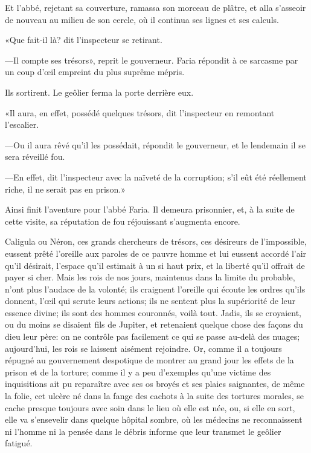 Et l'abbé, rejetant sa couverture, ramassa son morceau de plâtre, et alla s'asseoir de nouveau au milieu de son cercle, où il continua ses lignes et ses calculs.

«Que fait-il là? dit l'inspecteur se retirant.

—Il compte ses trésors», reprit le gouverneur. Faria répondit à ce sarcasme par un coup d'œil empreint du plus suprême mépris.

Ils sortirent. Le geôlier ferma la porte derrière eux.

«Il aura, en effet, possédé quelques trésors, dit l'inspecteur en remontant l'escalier.

—Ou il aura rêvé qu'il les possédait, répondit le gouverneur, et le lendemain il se sera réveillé fou.

—En effet, dit l'inspecteur avec la naïveté de la corruption; s'il eût été réellement riche, il ne serait pas en prison.»

Ainsi finit l'aventure pour l'abbé Faria. Il demeura prisonnier, et, à la suite de cette visite, sa réputation de fou réjouissant s'augmenta encore.

Caligula ou Néron, ces grands chercheurs de trésors, ces désireurs de l'impossible, eussent prêté l'oreille aux paroles de ce pauvre homme et lui eussent accordé l'air qu'il désirait, l'espace qu'il estimait à un si haut prix, et la liberté qu'il offrait de payer si cher. Mais les rois de nos jours, maintenus dans la limite du probable, n'ont plus l'audace de la volonté; ils craignent l'oreille qui écoute les ordres qu'ils donnent, l'œil qui scrute leurs actions; ils ne sentent plus la supériorité de leur essence divine; ils sont des hommes couronnés, voilà tout. Jadis, ils se croyaient, ou du moins se disaient fils de Jupiter, et retenaient quelque chose des façons du dieu leur père: on ne contrôle pas facilement ce qui se passe au-delà des nuages; aujourd'hui, les rois se laissent aisément rejoindre. Or, comme il a toujours répugné au gouvernement despotique de montrer au grand jour les effets de la prison et de la torture; comme il y a peu d'exemples qu'une victime des inquisitions ait pu reparaître avec ses os broyés et ses plaies saignantes, de même la folie, cet ulcère né dans la fange des cachots à la suite des tortures morales, se cache presque toujours avec soin dans le lieu où elle est née, ou, si elle en sort, elle va s'ensevelir dans quelque hôpital sombre, où les médecins ne reconnaissent ni l'homme ni la pensée dans le débris informe que leur transmet le geôlier fatigué.

